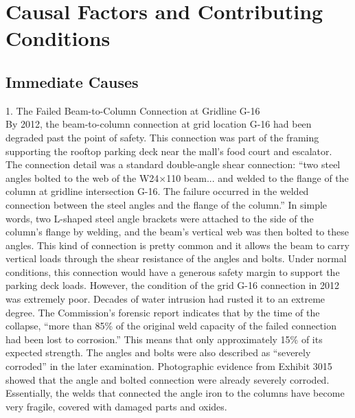 \documentclass[12pt]{article}
\begin{document}
\section{Causal Factors and Contributing Conditions}

\subsection{Immediate Causes}

1. The Failed Beam-to-Column Connection at Gridline G-16 \\
By 2012, the beam-to-column connection at grid location G-16 had been degraded past the point of safety. This connection was part of the framing supporting the rooftop parking deck near the mall’s food court and escalator. The connection detail was a standard double-angle shear connection: “two steel angles bolted to the web of the W24×110 beam... and welded to the flange of the column at gridline intersection G-16. The failure occurred in the welded connection between the steel angles and the flange of the column.” In simple words, two L-shaped steel angle brackets were attached to the side of the column’s flange by welding, and the beam’s vertical web was then bolted to these angles. This kind of connection is pretty common and it allows the beam to carry vertical loads through the shear resistance of the angles and bolts. Under normal conditions, this connection would have a generous safety margin to support the parking deck loads.
However, the condition of the grid G-16 connection in 2012 was extremely poor. Decades of water intrusion had rusted it to an extreme degree. The Commission’s forensic report indicates that by the time of the collapse, “more than 85\% of the original weld capacity of the failed connection had been lost to corrosion.” This means that only approximately 15\% of its expected strength. The angles and bolts were also described as “severely corroded” in the later examination. Photographic evidence from Exhibit 3015 showed that the angle and bolted connection were already severely corroded. Essentially, the welds that connected the angle iron to the columns have become very fragile, covered with damaged parts and oxides.
\end{document}
